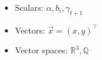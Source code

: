 \begin{itemize}
  \item Scalars: $\alpha, b_i, \gamma_{t+1}$
  \item Vectors: $\vec{x} = \left( x, y \right)^\top$
  \item Vector spaces: $\mathbb{R}^3, \mathbb{Q}$
\end{itemize}
